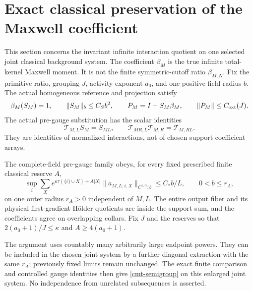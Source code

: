 \section{Exact classical preservation of the Maxwell coefficient}
\label{cmt-section}

This section concerns the invariant infinite interaction quotient
on one selected joint classical background system. The coefficient
\(\beta_M\) is the true infinite total-kernel Maxwell moment.
It is not the finite symmetric-cutoff ratio \(\beta_{M,N}\).
Fix the primitive ratio, grouping \(J\), activity exponent \(a_0\),
and one positive field radius \(b\). The actual homogeneous
reference and projection satisfy
\begin{equation}
 \beta_M(S_M)=1,\qquad \|S_M\|_b\le C_Sb^2,\qquad
 P_M=I-S_M\beta_M,\qquad \|P_M\|\le C_{\rm ext}(J).
 \label{cmt-reference}
\end{equation}
The actual pre-gauge substitution has the scalar identities
\begin{equation}
 \mathcal T_{M,L}S_M=S_{ML},\qquad
 \mathcal T_{MR,L}\mathcal T_{M,R}
                       =\mathcal T_{M,RL}.
 \label{cmt-semigroup}
\end{equation}
They are identities of normalized interactions, not of chosen
support coefficient arrays.

The complete-field pre-gauge family obeys, for every fixed
prescribed finite classical reserve \(A\),
\begin{equation}
 \sup_i\sum_X e^{\kappa\tau(\{i\}\cup X)+A|X|}
       \|a_{M,L;i,X}\|_{C^{1,\alpha};b}
           \le C_* b/L,\qquad 0<b\le r_A,
 \label{cmt-uniform-family}
\end{equation}
on one outer radius \(r_A>0\) independent of \(M,L\).
The entire output fiber and its physical first-gradient
H\"older quotients are inside the support sum, and the
coefficients agree on overlapping collars. Fix \(J\) and
the reserves so that \(2(a_0+1)/J\le\kappa\) and
\(A\ge4(a_0+1)\).

The argument uses countably many arbitrarily large endpoint
powers. They can be included in the chosen joint system by
a further diagonal extraction with the same \(r_A\);
previously fixed limits remain unchanged. The exact finite
comparison and controlled gauge identities then give
\eqref{cmt-semigroup} on this enlarged joint system.
No independence from unrelated subsequences is asserted.

